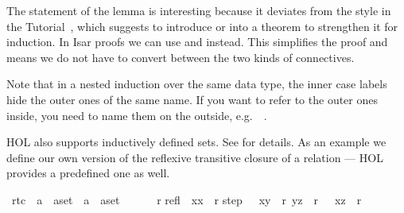 \begin{isabellebody}
\begin{isamarkuptext}
The statement of the lemma is interesting because it deviates from the style in
the Tutorial~\cite{LNCS2283}, which suggests to introduce \isa{{\isasymforall}} or
\isa{{\isasymlongrightarrow}} into a theorem to strengthen it for induction. In Isar
proofs we can use \isa{{\isasymAnd}} and \isa{{\isasymLongrightarrow}} instead. This simplifies the
proof and means we do not have to convert between the two kinds of
connectives.

Note that in a nested induction over the same data type, the inner
case labels hide the outer ones of the same name. If you want to refer
to the outer ones inside, you need to name them on the outside, e.g.\
~.%
\end{isamarkuptext}%
\isamarkuptrue%
%
\isamarkuptrue%
%
\begin{isamarkuptext}%
HOL also supports inductively defined sets. See \cite{LNCS2283}
for details. As an example we define our own version of the reflexive
transitive closure of a relation --- HOL provides a predefined one as well.%
\end{isamarkuptext}%
\isamarkuptrue%
\ rtc\ {\isacharcolon}{\isacharcolon}\ {\isachardoublequote}{\isacharparenleft}{\isacharprime}a\ {\isasymtimes}\ {\isacharprime}a{\isacharparenright}set\ {\isasymRightarrow}\ {\isacharparenleft}{\isacharprime}a\ {\isasymtimes}\ {\isacharprime}a{\isacharparenright}set{\isachardoublequote}\ \ \ {\isacharparenleft}{\isachardoublequote}{\isacharunderscore}{\isacharasterisk}{\isachardoublequote}\ {\isacharbrackleft}{}{}{}{}{\isacharbrackright}\ {}{}{}{\isacharparenright}\isanewline
\isamarkupfalse%
\ {\isachardoublequote}r{\isacharasterisk}{\isachardoublequote}\isanewline
\isakeyword{intros}\isanewline
refl{\isacharcolon}\ \ {\isachardoublequote}{\isacharparenleft}x{\isacharcomma}x{\isacharparenright}\ {\isasymin}\ r{\isacharasterisk}{\isachardoublequote}\isanewline
step{\isacharcolon}\ \ {\isachardoublequote}{\isasymlbrakk}\ {\isacharparenleft}x{\isacharcomma}y{\isacharparenright}\ {\isasymin}\ r{\isacharsemicolon}\ {\isacharparenleft}y{\isacharcomma}z{\isacharparenright}\ {\isasymin}\ r{\isacharasterisk}\ {\isasymrbrakk}\ {\isasymLongrightarrow}\ {\isacharparenleft}x{\isacharcomma}z{\isacharparenright}\ {\isasymin}\ r{\isacharasterisk}{\isachardoublequote}\isamarkupfalse%
%
\begin{isamarkuptext}%

\end{isamarkuptext}
\end{isabellebody}
